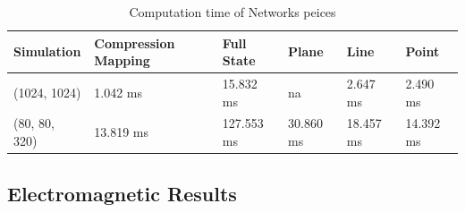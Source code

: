 \documentclass{article}
\begin{document}
\begin{table}[]
\caption{Computation time of Networks peices} \label{compute_times}
\centering
\begin{tabular}{|l|lllll|}
\hline
Simulation    & Compression Mapping & Full State  & Plane      & Line       & Point   \\ \hline
(1024, 1024)  & 1.042 ms            & 15.832 ms   & na         & 2.647 ms   & 2.490 ms \\ 
(80, 80, 320) & 13.819 ms           & 127.553 ms  & 30.860 ms  & 18.457 ms  & 14.392 ms \\ 
\hline
\end{tabular}
\end{table}

\subsection{Electromagnetic Results}
\end{document}
